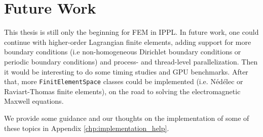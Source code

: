 \section{Future Work}
\label{sec:future_work}

This thesis is still only the beginning for FEM in IPPL.
In future work, one could continue with higher-order Lagrangian finite elements,
adding support for more boundary conditions
(i.e non-homogeneous Dirichlet boundary conditions or periodic boundary conditions) and
process- and thread-level parallelization.
Then it would be interesting to do some timing studies and GPU benchmarks.
After that, more \texttt{FinitElementSpace} classes could be implemented
(i.e. Nédélec or Raviart-Thomas finite elements), on the road to solving the electromagnetic Maxwell equations.

We provide some guidance and our thoughts on the implementation
of some of these topics in Appendix \ref{chp:implementation_help}.